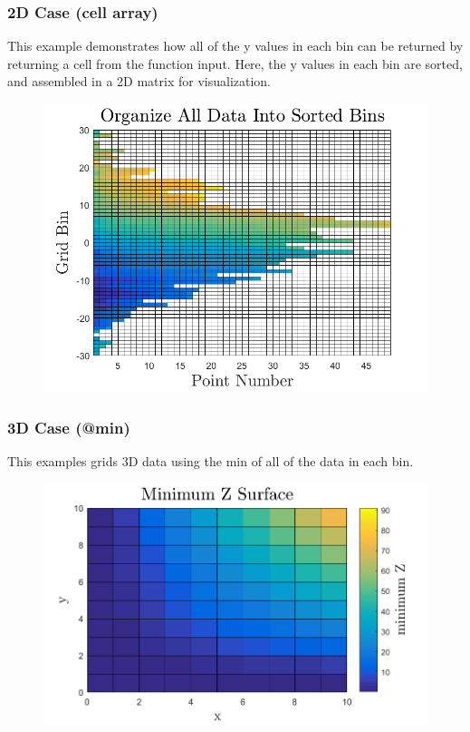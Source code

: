 \documentclass{article}
\begin{document}
\clearpage
\subsubsection*{2D Case (cell array)}
This example demonstrates how all of the y values in each bin can be returned by returning a cell from the function input.  Here, the y values in each bin are sorted, and assembled in a 2D matrix for visualization.


\begin{figure}[H]
	\centering
	\includegraphics[width = \linewidth]{2dbins}
\end{figure}

\clearpage
\subsubsection*{3D Case (@min)}
This examples grids 3D data using the min of all of the data in each bin.


\begin{figure}[H]
	\centering
	\includegraphics[width = \linewidth]{3d}
\end{figure}
\end{document}
